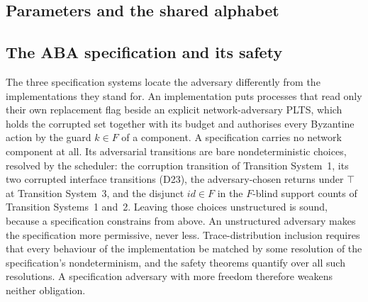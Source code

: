 \subsection{Parameters and the shared alphabet}






\subsection{The ABA specification and its safety}

The three specification systems locate the adversary differently from the implementations they stand for.
An implementation puts processes that read only their own replacement flag beside an explicit network-adversary PLTS, which holds the corrupted set together with its budget and authorises every Byzantine action by the guard $k \in F$ of a component.
A specification carries no network component at all.
Its adversarial transitions are bare nondeterministic choices, resolved by the scheduler: the corruption transition of Transition System~1, its two corrupted interface transitions (D23), the adversary-chosen returns under $\top$ at Transition System~3, and the disjunct $id \in F$ in the $F$-blind support counts of Transition Systems~1 and~2.
Leaving those choices unstructured is sound, because a specification constrains from above.
An unstructured adversary makes the specification more permissive, never less.
Trace-distribution inclusion requires that every behaviour of the implementation be matched by some resolution of the specification's nondeterminism, and the safety theorems quantify over all such resolutions.
A specification adversary with more freedom therefore weakens neither obligation.



